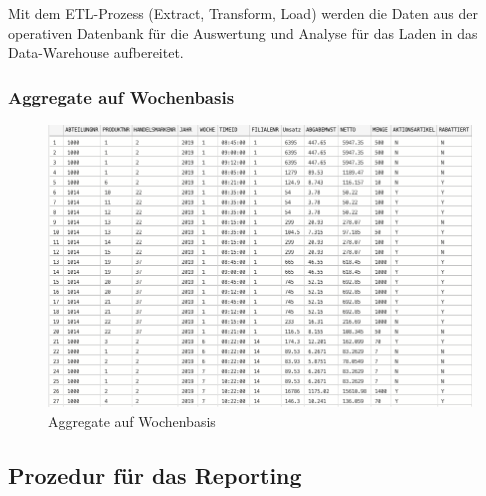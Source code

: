 Mit dem ETL-Prozess (Extract, Transform, Load) werden die Daten aus der operativen Datenbank für die Auswertung und Analyse für das Laden in das Data-Warehouse aufbereitet.


\subsubsection{Aggregate auf Wochenbasis}

\begin{figure}[ht!]
  \centering
  \includegraphics[width=1.1\linewidth]{pictures/fakten_woche.png}
  \caption{Aggregate auf Wochenbasis}
  \label{fakten_woche}
\end{figure}


\textcolor{red}{\blindtext}

\subsection{Prozedur für das Reporting}

